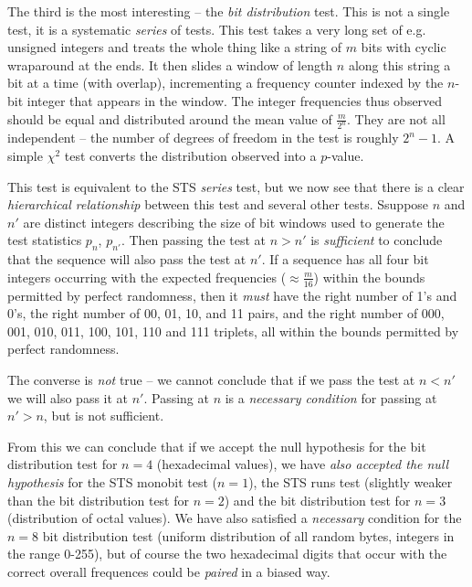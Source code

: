 \documentclass{book}
\begin{document}
The third is the most interesting -- the {\em bit distribution} test.
This is not a single test, it is a systematic {\em series} of tests.
This test takes a very long set of e.g. unsigned integers and treats the
whole thing like a string of $m$ bits with cyclic wraparound at the
ends.  It then slides a window of length $n$ along this string a bit at
a time (with overlap), incrementing a frequency counter indexed by the
$n$-bit integer that appears in the window.  The integer frequencies
thus observed should be equal and distributed around the mean value of
$\frac{m}{2^n}$.  They are not all independent -- the number of degrees
of freedom in the test is roughly $2^n - 1$.  A simple $\chi^2$ test
converts the distribution observed into a $p$-value.

This test is equivalent to the STS {\em series} test, but we now see
that there is a clear {\em hierarchical relationship} between this test
and several other tests.  Ssuppose $n$ and $n'$ are distinct integers
describing the size of bit windows used to generate the test statistics
$p_n$, $p_{n'}$.  Then passing the test at $n > n'$ is {\em sufficient}
to conclude that the sequence will also pass the test at $n'$.  If a
sequence has all four bit integers occurring with the expected
frequencies ($\approx \frac{m}{16}$) within the bounds permitted by
perfect randomness, then it {\em must} have the right number of 1's and
0's, the right number of 00, 01, 10, and 11 pairs, and the right number
of 000, 001, 010, 011, 100, 101, 110 and 111 triplets, all within the
bounds permitted by perfect randomness.

The converse is {\em not} true -- we cannot conclude that if we pass the
test at $n < n'$ we will also pass it at $n'$.  Passing at $n$ is a {\em
necessary condition} for passing at $n' > n$, but is not sufficient.

From this we can conclude that if we accept the null hypothesis for the
bit distribution test for $n = 4$ (hexadecimal values), we have {\em
also accepted the null hypothesis} for the STS monobit test ($n = 1$),
the STS runs test (slightly weaker than the bit distribution test for $n
= 2$) and the bit distribution test for $n = 3$ (distribution of octal
values).  We have also satisfied a {\em necessary} condition for the $n
= 8$ bit distribution test (uniform distribution of all random bytes,
integers in the range 0-255), but of course the two hexadecimal digits
that occur with the correct overall frequences could be {\em paired} in
a biased way.
\end{document}
